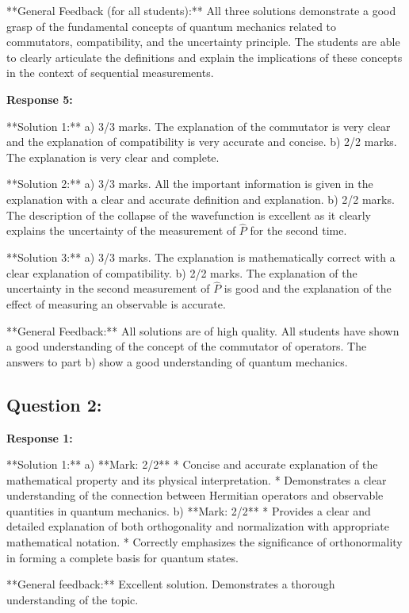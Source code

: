\documentclass[a4paper,11pt]{article}
\begin{document}
**General Feedback (for all students):** All three solutions demonstrate a good grasp of the fundamental concepts of quantum mechanics related to commutators, compatibility, and the uncertainty principle. The students are able to clearly articulate the definitions and explain the implications of these concepts in the context of sequential measurements. 

\bigskip    
\textbf{Response 5:}

**Solution 1:**
a) 3/3 marks. The explanation of the commutator is very clear and the explanation of compatibility is very accurate and concise.
b) 2/2 marks. The explanation is very clear and complete.

**Solution 2:**
a) 3/3 marks. All the important information is given in the explanation with a clear and accurate definition and explanation.
b) 2/2 marks. The description of the collapse of the wavefunction is excellent as it clearly explains the uncertainty of the measurement of \( \hat{P} \) for the second time. 

**Solution 3:**
a) 3/3 marks. The explanation is mathematically correct with a clear explanation of compatibility.
b) 2/2 marks. The explanation of the uncertainty in the second measurement of \( \hat{P} \) is good and the explanation of the effect of measuring an observable is accurate.

**General Feedback:**
All solutions are of high quality. All students have shown a good understanding of the concept of the commutator of operators. The answers to part b) show a good understanding of quantum mechanics.

\subsection*{Question 2:}

\textbf{Response 1:}

**Solution 1:**
a) **Mark: 2/2**
* Concise and accurate explanation of the mathematical property and its physical interpretation. 
* Demonstrates a clear understanding of the connection between Hermitian operators and observable quantities in quantum mechanics. 
b) **Mark: 2/2** 
* Provides a clear and detailed explanation of both orthogonality and normalization with appropriate mathematical notation. 
* Correctly emphasizes the significance of orthonormality in forming a complete basis for quantum states. 

**General feedback:** Excellent solution. Demonstrates a thorough understanding of the topic. 
\end{document}
